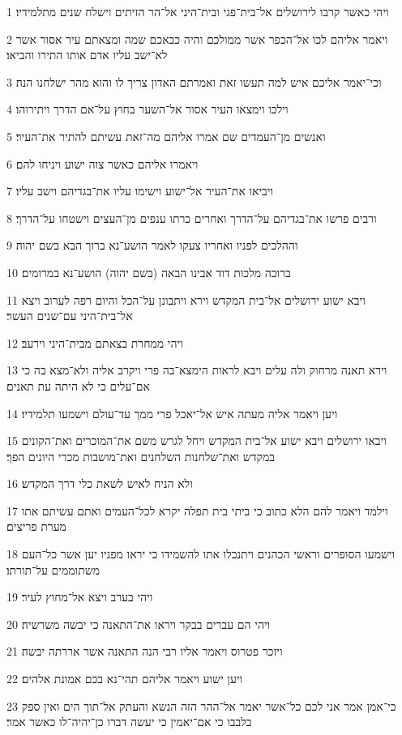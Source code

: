 \par 1 ויהי כאשר קרבו לירושלים אל־בית־פגי ובית־היני אל־הר הזיתים וישלח שנים מתלמידיו׃
\par 2 ויאמר אליהם לכו אל־הכפר אשר ממולכם והיה כבאכם שמה ומצאתם עיר אסור אשר לא־ישב עליו אדם אותו התירו והביאו׃
\par 3 וכי־יאמר אליכם איש למה תעשו זאת ואמרתם האדון צריך לו והוא מהר ישלחנו הנה׃
\par 4 וילכו וימצאו העיר אסור אל־השער בחוץ על־אם הדרך ויתירוהו׃
\par 5 ואנשים מן־העמדים שם אמרו אליהם מה־זאת עשיתם להתיר את־העיר׃
\par 6 ויאמרו אליהם כאשר צוה ישוע ויניחו להם׃
\par 7 ויביאו את־העיר אל־ישוע וישימו עליו את־בגדיהם וישב עליו׃
\par 8 ורבים פרשו את־בגדיהם על־הדרך ואחרים כרתו ענפים מן־העצים וישטחו על־הדרך׃
\par 9 וההלכים לפניו ואחריו צעקו לאמר הושע־נא ברוך הבא בשם יהוה׃
\par 10 ברוכה מלכות דוד אבינו הבאה (בשם יהוה) הושע־נא במרומים׃
\par 11 ויבא ישוע ירושלים אל־בית המקדש וירא ויתבונן על־הכל והיום רפה לערוב ויצא אל־בית־היני עם־שנים העשר׃
\par 12 ויהי ממחרת בצאתם מבית־היני וירעב׃
\par 13 וירא תאנה מרחוק ולה עלים ויבא לראות הימצא־בה פרי ויקרב אליה ולא־מצא בה כי אם־עלים כי לא היתה עת תאנים׃
\par 14 ויען ויאמר אליה מעתה איש אל־יאכל פרי ממך עד־עולם וישמעו תלמידיו׃
\par 15 ויבאו ירושלים ויבא ישוע אל־בית המקדש ויחל לגרש משם את־המוכרים ואת־הקונים במקדש ואת־שלחנות השלחנים ואת־מושבות מכרי היונים הפך׃
\par 16 ולא הניח לאיש לשאת כלי דרך המקדש׃
\par 17 וילמד ויאמר להם הלא כתוב כי ביתי בית תפלה יקרא לכל־העמים ואתם עשיתם אתו מערת פריצים׃
\par 18 וישמעו הסופרים וראשי הכהנים ויתנכלו אתו להשמידו כי יראו מפניו יען אשר כל־העם משתוממים על־תורתו׃
\par 19 ויהי בערב ויצא אל־מחוץ לעיר׃
\par 20 ויהי הם עברים בבקר ויראו את־התאנה כי יבשה משרשיה׃
\par 21 ויזכר פטרוס ויאמר אליו רבי הנה התאנה אשר אררתה יבשה׃
\par 22 ויען ישוע ויאמר אליהם תהי־נא בכם אמונת אלהים׃
\par 23 כי־אמן אמר אני לכם כל־אשר יאמר אל־ההר הזה הנשא והעתק אל־תוך הים ואין ספק בלבבו כי אם־יאמין כי יעשה דברו כן־יהיה־לו כאשר אמר׃
